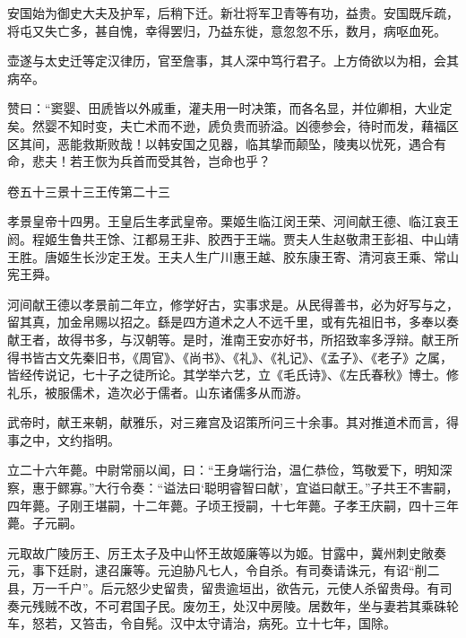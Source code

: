 \documentclass[12pt,UTF8]{ctexbook}
\begin{document}
安国始为御史大夫及护军，后稍下迁。新壮将军卫青等有功，益贵。安国既斥疏，将屯又失亡多，甚自愧，幸得罢归，乃益东徙，意忽忽不乐，数月，病呕血死。



壶遂与太史迁等定汉律历，官至詹事，其人深中笃行君子。上方倚欲以为相，会其病卒。



赞曰：“窦婴、田虒皆以外戚重，灌夫用一时决策，而各名显，并位卿相，大业定矣。然婴不知时变，夫亡术而不逊，虒负贵而骄溢。凶德参会，待时而发，藉福区区其间，恶能救斯败哉！以韩安国之见器，临其挚而颠坠，陵夷以忧死，遇合有命，悲夫！若王恢为兵首而受其咎，岂命也乎？





卷五十三景十三王传第二十三



孝景皇帝十四男。王皇后生孝武皇帝。栗姬生临江闵王荣、河间献王德、临江哀王阏。程姬生鲁共王馀、江都易王非、胶西于王端。贾夫人生赵敬肃王彭祖、中山靖王胜。唐姬生长沙定王发。王夫人生广川惠王越、胶东康王寄、清河哀王乘、常山宪王舜。



河间献王德以孝景前二年立，修学好古，实事求是。从民得善书，必为好写与之，留其真，加金帛赐以招之。繇是四方道术之人不远千里，或有先祖旧书，多奉以奏献王者，故得书多，与汉朝等。是时，淮南王安亦好书，所招致率多浮辩。献王所得书皆古文先秦旧书，《周官》、《尚书》、《礼》、《礼记》、《孟子》、《老子》之属，皆经传说记，七十子之徒所论。其学举六艺，立《毛氏诗》、《左氏春秋》博士。修礼乐，被服儒术，造次必于儒者。山东诸儒多从而游。



武帝时，献王来朝，献雅乐，对三雍宫及诏策所问三十余事。其对推道术而言，得事之中，文约指明。



立二十六年薨。中尉常丽以闻，曰：“王身端行治，温仁恭俭，笃敬爱下，明知深察，惠于鳏寡。”大行令奏：“谥法曰‘聪明睿智曰献’，宜谥曰献王。”子共王不害嗣，四年薨。子刚王堪嗣，十二年薨。子顷王授嗣，十七年薨。子孝王庆嗣，四十三年薨。子元嗣。



元取故广陵厉王、厉王太子及中山怀王故姬廉等以为姬。甘露中，冀州刺史敞奏元，事下廷尉，逮召廉等。元迫胁凡七人，令自杀。有司奏请诛元，有诏“削二县，万一千户”。后元怒少史留贵，留贵逾垣出，欲告元，元使人杀留贵母。有司奏元残贼不改，不可君国子民。废勿王，处汉中房陵。居数年，坐与妻若其乘硃轮车，怒若，又笞击，令自髡。汉中太守请治，病死。立十七年，国除。
\end{document}
